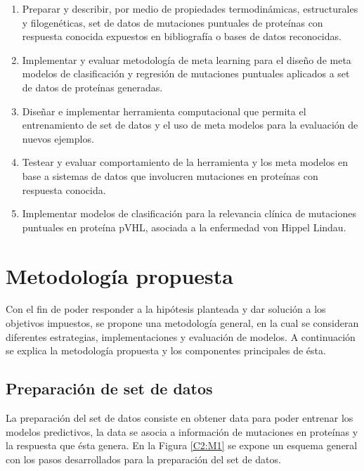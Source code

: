 \begin{enumerate}
	
	\item Preparar y describir, por medio de propiedades termodinámicas, estructurales y filogenéticas, set de datos de mutaciones puntuales de proteínas con respuesta conocida expuestos en bibliografía o bases de datos reconocidas.
	
	\item Implementar y evaluar metodología de meta learning para el diseño de meta modelos de clasificación y regresión de mutaciones puntuales aplicados a set de datos de proteínas generadas.
	
	\item Diseñar e implementar herramienta computacional que permita el entrenamiento de set de datos y el uso de meta modelos para la evaluación de nuevos ejemplos.
	
	\item Testear y evaluar comportamiento de la herramienta y los meta modelos en base a sistemas de datos que involucren mutaciones en proteínas con respuesta conocida.
	
	\item Implementar modelos de clasificación para la relevancia clínica de mutaciones puntuales en proteína pVHL, asociada a la enfermedad von Hippel Lindau. 
	
\end{enumerate}

\section{Metodología propuesta}

Con el fin de poder responder a la hipótesis planteada y dar solución a los objetivos impuestos, se propone una metodología general, en la cual se consideran diferentes estrategias, implementaciones y evaluación de modelos. A continuación se explica la metodología propuesta y los componentes principales de ésta.

\subsection{Preparación de set de datos}

La preparación del set de datos consiste en obtener data para poder entrenar los modelos  predictivos, la data se asocia a información de mutaciones en proteínas y la respuesta que ésta genera. En la Figura \ref{C2:M1} se expone un esquema general con los pasos desarrollados para la preparación del set de datos.

